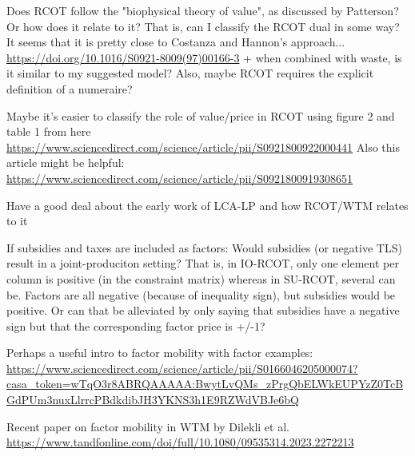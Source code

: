 \documentclass{article}
\begin{document}
\begin{refsection}
Does RCOT follow the "biophysical theory of  value", as discussed by Patterson? Or how does it relate to it? That is, can I classify the RCOT dual in some way? It seems that it is pretty close to Costanza and Hannon's approach... \url{https://doi.org/10.1016/S0921-8009(97)00166-3} + when combined with waste, is it similar to my suggested model? Also, maybe RCOT requires the explicit definition of a numeraire?

Maybe it's easier to classify the role of value/price in RCOT using figure 2 and table 1 from here \url{https://www.sciencedirect.com/science/article/pii/S0921800922000441} Also this article might be helpful: \url{https://www.sciencedirect.com/science/article/pii/S0921800919308651}

Have a good deal about the early work of LCA-LP and how RCOT/WTM relates to it

If subsidies and taxes are included as factors: Would subsidies (or negative TLS) result in a joint-produciton setting? That is, in IO-RCOT, only one element per column is positive (in the constraint matrix) whereas in SU-RCOT, several can be. Factors are all negative (because of inequality sign), but subsidies would be positive. Or can that be alleviated by only saying that subsidies have a negative sign but that the corresponding factor price is +/-1?

Perhaps a useful intro to factor mobility with factor examples: \url{https://www.sciencedirect.com/science/article/pii/S0166046205000074?casa_token=wTqO3r8ABRQAAAAA:BwytLvQMs_zPrgQbELWkEUPYzZ0TcBGdPUm3nuxLlrrcPBdkdibJH3YKNS3h1E9RZWdVBJe6bQ}

Recent paper on factor mobility in WTM by Dilekli et al. \url{https://www.tandfonline.com/doi/full/10.1080/09535314.2023.2272213}

\nolinenumbers
\newpage
\newrefcontext[sorting=nyt] %
\printbibliography[title = References in appendix]

\end{refsection}
\end{document}
